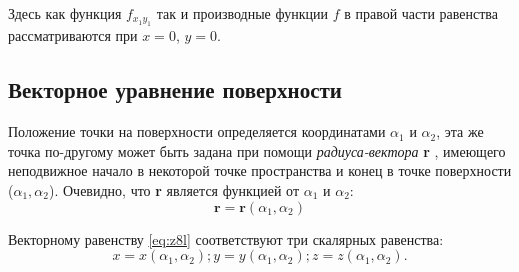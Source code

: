 \documentclass[a4paper,12pt]{book}
\begin{document}
Здесь как функция $f_{x_1 y_1}$ так и производные функции $f$ в правой части равенства рассматриваются при $x=0$, $y=0$.

	\subsection{Векторное уравнение поверхности}
	Положение точки на поверхности определяется координатами
$\alpha_1$ и $\alpha_2$, эта же точка по-другому может быть задана при помощи \textit{радиуса-вектора} \textbf{r} , имеющего неподвижное начало в некоторой
точке пространства и конец в точке поверхности ($\alpha_1, \alpha_2$). Очевидно,
что \textbf{r} является функцией от $\alpha_1$ и $\alpha_2$:
	\begin{equation}
		\label{eq:z8l}
		\textbf{r} = \textbf{r}(\alpha_1, \alpha_2)
	\end{equation}
	
	Векторному равенству \eqref{eq:z8l} соответствуют три скалярных равенства:
	\begin{displaymath}
		x=x(\alpha_1, \alpha_2); y=y(\alpha_1, \alpha_2); z=z(\alpha_1, \alpha_2).
	\end{displaymath}
\end{document}
